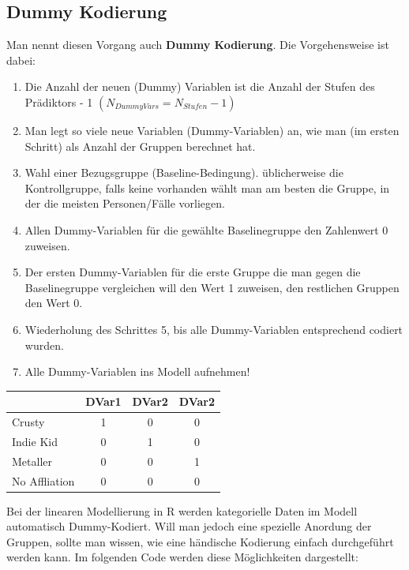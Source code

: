 \documentclass[
]{article}
\providecommand{\tightlist}{%
  \setlength{\itemsep}{0pt}\setlength{\parskip}{0pt}}
\begin{document}
\subsection*{Dummy Kodierung}\label{dummy-kodierung}

Man nennt diesen Vorgang auch \textbf{Dummy Kodierung}. Die Vorgehensweise ist dabei:

\begin{enumerate}
\def\labelenumi{\arabic{enumi}.}
\tightlist
\item
  Die Anzahl der neuen (Dummy) Variablen ist die Anzahl der Stufen des Prädiktors - 1 \((N_{DummyVars} = N_{Stufen} - 1)\)
\item
  Man legt so viele neue Variablen (Dummy-Variablen) an, wie man (im ersten Schritt) als Anzahl der Gruppen berechnet hat.
\item
  Wahl einer Bezugsgruppe (Baseline-Bedingung). üblicherweise die Kontrollgruppe, falls keine vorhanden wählt man am besten die Gruppe, in der die meisten Personen/Fälle vorliegen.
\item
  Allen Dummy-Variablen für die gewählte Baselinegruppe den Zahlenwert 0 zuweisen.
\item
  Der ersten Dummy-Variablen für die erste Gruppe die man gegen die Baselinegruppe vergleichen will den Wert 1 zuweisen, den restlichen Gruppen den Wert 0.
\item
  Wiederholung des Schrittes 5, bis alle Dummy-Variablen entsprechend codiert wurden.
\item
  Alle Dummy-Variablen ins Modell aufnehmen!
\end{enumerate}

\begin{longtable}[]{@{}lccc@{}}
\toprule\noalign{}
& DVar1 & DVar2 & DVar2 \\
\midrule\noalign{}
\endhead
\bottomrule\noalign{}
\endlastfoot
Crusty & 1 & 0 & 0 \\
Indie Kid & 0 & 1 & 0 \\
Metaller & 0 & 0 & 1 \\
No Affliation & 0 & 0 & 0 \\
\end{longtable}

Bei der linearen Modellierung in R werden kategorielle Daten im Modell automatisch Dummy-Kodiert. Will man jedoch eine spezielle Anordung der Gruppen, sollte man wissen, wie eine händische Kodierung einfach durchgeführt werden kann. Im folgenden Code werden diese Möglichkeiten dargestellt:
\end{document}
